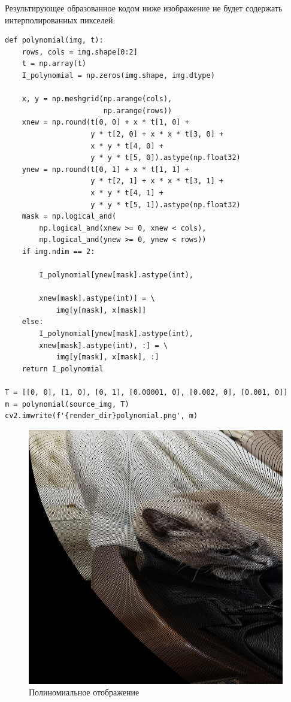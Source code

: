 \documentclass[a4paper, 16pt]{article}
\begin{document}
\noindent Результирующее образованное кодом ниже изображение не будет содержать интерполированных пикселей:
\begin{lstlisting}[label=polynomial-code,caption=Код для полиномиального отображения]
def polynomial(img, t):
    rows, cols = img.shape[0:2]
    t = np.array(t)
    I_polynomial = np.zeros(img.shape, img.dtype)

    x, y = np.meshgrid(np.arange(cols),
                       np.arange(rows))
    xnew = np.round(t[0, 0] + x * t[1, 0] +
                    y * t[2, 0] + x * x * t[3, 0] +
                    x * y * t[4, 0] +
                    y * y * t[5, 0]).astype(np.float32)
    ynew = np.round(t[0, 1] + x * t[1, 1] +
                    y * t[2, 1] + x * x * t[3, 1] +
                    x * y * t[4, 1] +
                    y * y * t[5, 1]).astype(np.float32)
    mask = np.logical_and(
        np.logical_and(xnew >= 0, xnew < cols),
        np.logical_and(ynew >= 0, ynew < rows))
    if img.ndim == 2:

        I_polynomial[ynew[mask].astype(int),

        xnew[mask].astype(int)] = \
            img[y[mask], x[mask]]
    else:
        I_polynomial[ynew[mask].astype(int),
        xnew[mask].astype(int), :] = \
            img[y[mask], x[mask], :]
    return I_polynomial

T = [[0, 0], [1, 0], [0, 1], [0.00001, 0], [0.002, 0], [0.001, 0]]
m = polynomial(source_img, T)
cv2.imwrite(f'{render_dir}polynomial.png', m)
\end{lstlisting}


\begin{figure}[!htb]
    \centering
    \includegraphics[scale=0.3]{polynomial.png}
    \captionsetup{skip=0pt}
    \caption{Полиномиальное отображение}
    \label{Рис:14}
\end{figure}
\end{document}
